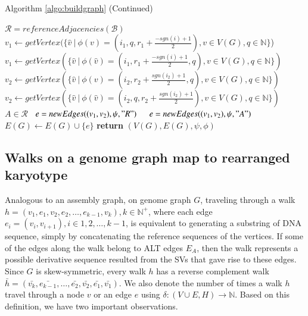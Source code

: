 \documentclass[phd,tocprelim]{cornell}
\begin{document}
\newpage

\begin{algorithm}[h!]
    \centering
    Algorithm \ref{algo:buildgraph} (Continued)
    \begin{algorithmic}
        \State $\mathcal{R} = referenceAdjacencies(\mathcal{B})$  
        \State $v_1 \gets getVertex(\{ \hat{v} \ | \ \phi(v) = (i_1, q, r_1+\frac{-sgn(i)+1}{2}), v \in V(G), q \in \mathbb{N}\}$)
        \Else
        \State $v_1 \gets getVertex(\{ \hat{v} \ | \ \phi(\hat{v}) = (i_1, r_1 + \frac{-sgn(i)+1}{2}, q), v \in V(G), q \in \mathbb{N}\})$
        \EndIf
        \State $v_2 \gets getVertex(\{ \hat{v} \ | \ \phi(v) = (i_2, r_2 + \frac{sgn(i_2)+1}{2}, q), v \in V(G), q \in \mathbb{N}\})$
        \Else
        \State $v_2 \gets getVertex(\{ \hat{v} \ | \ \phi(\hat{v}) = (i_2, q, r_2 + \frac{sgn(i_2)+1}{2}), v \in V(G), q \in \mathbb{N} \})$
        \EndIf
        \State \algorithmicif\ $A \in \mathcal{R}$ \algorithmicthen\ $e = newEdges((v_1, v_2), \psi, "R")$ \ \algorithmicelse \ $e = newEdges((v_1, v_2), \psi, "A")$
        \State $E(G) \gets E(G) \cup \{e\}$
        \EndFor
        \State \textbf{return} $(V(G), E(G), \psi, \phi)$
        \EndProcedure
    \end{algorithmic}
\end{algorithm}

\newpage

\subsection{Walks on a genome graph map to rearranged karyotype}
Analogous to an assembly graph, on genome graph $G$, traveling through a walk $h = (v_1, e_1, v_2, e_2, \dots, e_{k-1}, v_k), k \in \mathbb{N^+}$, where each edge $e_i = (v_i, v_{i+1}), i \in 1, 2, \dots, k-1$, is equivalent to generating a substring of DNA sequence, simply by concatenating the reference sequences of the vertices. If some of the edges along the walk belong to ALT edges $E_{A}$, then the walk represents a possible derivative sequence resulted from the SVs that gave rise to these edges. Since $G$ is skew-symmetric, every walk $h$ has a reverse complement walk $\bar{h} = (\bar{v_k}, \bar{e_{k-1}}, \dots, \bar{e_2}, \bar{v_2}, \bar{e_1}, \bar{v_1})$. We also denote the number of times a walk $h$ travel through a node $v$ or an edge $e$ using $\delta : (V \cup E, H) \rightarrow \mathbb{N}$. Based on this definition, we have two important observations.
\end{document}
